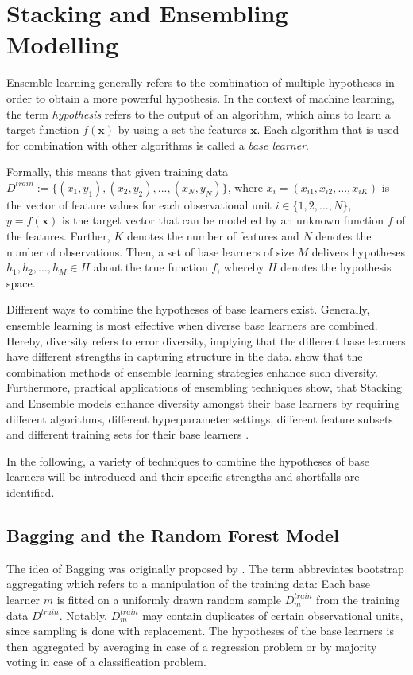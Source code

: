 \documentclass[12pt]{article}
\begin{document}

\section{Stacking and Ensembling Modelling}\label{theory}
Ensemble learning generally refers to the combination of multiple hypotheses in order to obtain a more powerful hypothesis. In the context of machine learning, the term \textit{hypothesis} refers to the output of an algorithm, which aims to learn a target function $f(\mathbf{x})$ by using a set the features $\mathbf{x}$. Each algorithm that is used for combination with other algorithms is called a \textit{base learner}.

Formally, this means that given training data $D^{train} := \{(x_1, y_1), (x_2, y_2),..., (x_N, y_N)\}$, where $x_i = (x_{i1}, x_{i2},..., x_{iK})$ is the vector of feature values for each observational unit $i \in \{1, 2,..., N\}$, $y = f(\mathbf{x})$ is the target vector that can be modelled by an unknown function $f$ of the features. Further, $K$ denotes the number of features and $N$ denotes the number of observations. Then, a set of base learners of size $M$ delivers hypotheses $h_1, h_2,..., h_M \in H$ about the true function $f$, whereby $H$ denotes the hypothesis space.

Different ways to combine the hypotheses of base learners exist. Generally, ensemble learning is most effective when diverse base learners are combined. Hereby, diversity refers to error diversity, implying that the different base learners have different strengths in capturing structure in the data. \cite{brown2005diversity} show that the combination methods of ensemble learning strategies enhance such diversity. Furthermore, practical applications of ensembling techniques show, that Stacking and Ensemble models enhance diversity amongst their base learners by requiring different algorithms, different hyperparameter settings, different feature subsets and different training sets for their base learners \citep{online2017stacking}. 

In the following, a variety of techniques to combine the hypotheses of base learners will be introduced and their specific strengths and shortfalls are identified. 

\subsection{Bagging and the Random Forest Model}
The idea of Bagging was originally proposed by \cite{breiman1996bagging}. The term abbreviates bootstrap aggregating which refers to a manipulation of the training data: Each base learner $m$ is fitted on a uniformly drawn random sample $D^{train}_m$ from the training data $D^{train}$. Notably, $D^{train}_m$ may contain duplicates of certain observational units, since sampling is done with replacement. The hypotheses of the base learners is then aggregated by averaging in case of a regression problem or by majority voting in case of a classification problem. 
\end{document}

